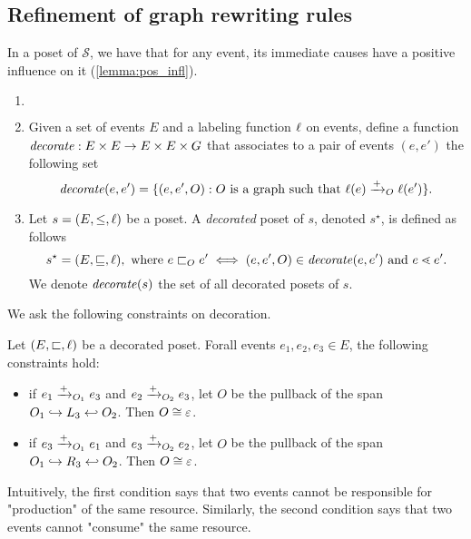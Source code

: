 \subsection{Refinement of graph rewriting rules}

In a poset of $\mathcal{S}$, we have that for any event, its immediate causes have a positive influence on it (\autoref{lemma:pos_infl}).

\begin{definition}
  \begin{enumerate}
  \item[] $~$
  \item Given a set of events $E$ and a labeling function $\ell$ on events, define a function $\mathit{decorate}:E\times E \to E\times E\times G$ that associates to a pair of events $(e,e')$ the following set
    \[
    \mathit{decorate}(e,e') = \{(e,e',O) : O\text{ is a graph such that }\ell(e)\mathrel{\xrightarrow{+}}_O \ell(e')\}.
    \]

  \item Let $s = (E,\leq,\ell)$ be a poset. A \emph{decorated} poset of $s$, denoted $s^{\star}$, is defined as follows
    \[
    s^{\star} = (E,\sqsubseteq,\ell), \text{ where }e\sqsubset_O e' \iff (e,e',O)\in\mathit{decorate}(e,e')\text{ and }e\lessdot e'.
    \]
    We denote $\mathit{decorate}(s)$ the set of all decorated posets of $s$.
  \end{enumerate}
\end{definition}

We ask the following constraints on decoration.
\begin{definition}
\label{def:constr_dec}
  Let $(E,\sqsubset,\ell)$ be a decorated poset. Forall events $e_1,e_2,e_3\in E$, the following constraints hold:
  \begin{itemize}
  \item if $e_1\mathrel{\xrightarrow{+}}_{O_1} e_3$ and $e_2\mathrel{\xrightarrow{+}}_{O_2} e_3$, let $O$ be the pullback of the span $O_1\hookrightarrow L_3\hookleftarrow O_2$. Then $O\cong\varepsilon$.
  \item if $e_3\mathrel{\xrightarrow{+}}_{O_1} e_1$ and $e_3\mathrel{\xrightarrow{+}}_{O_2} e_2$, let $O$ be the pullback of the span $O_1\hookrightarrow R_3\hookleftarrow O_2$. Then $O\cong\varepsilon$.
  \end{itemize}
\end{definition}
Intuitively, the first condition says that two events cannot be responsible for "production" of the same resource. Similarly, the second condition says that two events cannot "consume" the same resource.

